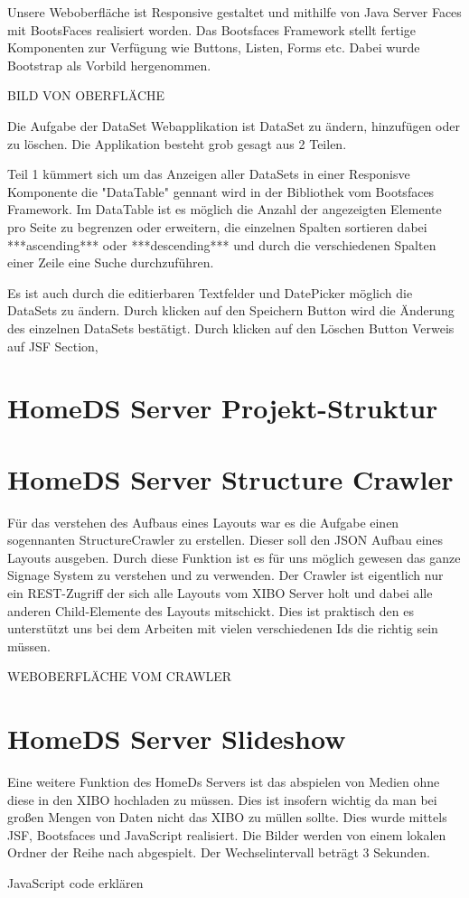 Unsere Weboberfläche ist Responsive gestaltet und mithilfe von Java Server Faces mit BootsFaces realisiert worden. Das Bootsfaces Framework stellt fertige Komponenten zur Verfügung wie Buttons, Listen, Forms etc. Dabei wurde Bootstrap als Vorbild hergenommen.

BILD VON OBERFLÄCHE

Die Aufgabe der DataSet Webapplikation ist DataSet zu ändern, hinzufügen oder zu löschen. Die Applikation besteht grob gesagt aus 2 Teilen. 

Teil 1 kümmert sich um das Anzeigen aller DataSets in einer Responisve Komponente die "DataTable" gennant wird in der Bibliothek vom Bootsfaces Framework. Im DataTable ist es möglich die Anzahl der angezeigten Elemente pro Seite zu begrenzen oder erweitern,  die einzelnen Spalten sortieren dabei ***ascending*** oder ***descending*** und durch die verschiedenen Spalten einer Zeile eine Suche durchzuführen. 

Es ist auch durch die editierbaren Textfelder und DatePicker möglich die DataSets zu ändern. Durch klicken auf den Speichern Button wird die Änderung des einzelnen DataSets bestätigt. Durch klicken auf den Löschen Button
Verweis auf JSF Section,

\section{HomeDS Server Projekt-Struktur}\label{sec:javaeestruktur}


\section{HomeDS Server Structure Crawler}\label{sec:javaeestructurecrawler}
Für das verstehen des Aufbaus eines Layouts war es die Aufgabe einen sogennanten StructureCrawler zu erstellen. Dieser soll den JSON Aufbau eines Layouts ausgeben. Durch diese Funktion ist es für uns möglich gewesen das ganze Signage System zu verstehen und zu verwenden. Der Crawler ist eigentlich nur ein REST-Zugriff der sich alle Layouts vom XIBO Server holt und dabei alle anderen Child-Elemente des Layouts mitschickt. Dies ist praktisch den es unterstützt uns bei dem Arbeiten mit vielen verschiedenen Ids die richtig sein müssen.

WEBOBERFLÄCHE VOM CRAWLER

\section{HomeDS Server Slideshow}\label{sec:homedsslideshow}
Eine weitere Funktion des HomeDs Servers ist das abspielen von Medien ohne diese in den XIBO hochladen zu müssen. Dies ist insofern wichtig da man bei großen Mengen von Daten nicht das XIBO zu müllen sollte. Dies wurde mittels JSF, Bootsfaces und JavaScript realisiert. Die Bilder werden von einem lokalen Ordner der Reihe nach abgespielt. Der Wechselintervall beträgt 3 Sekunden.

JavaScript	code erklären
